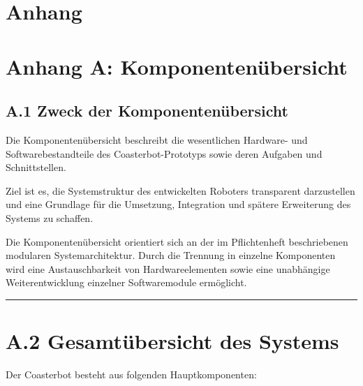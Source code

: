 \documentclass[
  a4paper,
  12pt,
  DIV=12,        %
  parskip=half,  %
  headings=small %
]{scrartcl}
\theoremstyle{definition}
\theoremstyle{definition}
\begin{document}
\section{Anhang}\label{anhang}

\section{Anhang A:
Komponentenübersicht}\label{anhang-a-komponentenuxfcbersicht}

\subsection{A.1 Zweck der
Komponentenübersicht}\label{a.1-zweck-der-komponentenuxfcbersicht}

Die Komponentenübersicht beschreibt die wesentlichen Hardware- und
Softwarebestandteile des Coasterbot-Prototyps sowie deren Aufgaben und
Schnittstellen.

Ziel ist es, die Systemstruktur des entwickelten Roboters transparent
darzustellen und eine Grundlage für die Umsetzung, Integration und
spätere Erweiterung des Systems zu schaffen.

Die Komponentenübersicht orientiert sich an der im Pflichtenheft
beschriebenen modularen Systemarchitektur. Durch die Trennung in
einzelne Komponenten wird eine Austauschbarkeit von Hardwareelementen
sowie eine unabhängige Weiterentwicklung einzelner Softwaremodule
ermöglicht.

\begin{center}\rule{0.5\linewidth}{0.5pt}\end{center}

\section{A.2 Gesamtübersicht des
Systems}\label{a.2-gesamtuxfcbersicht-des-systems}

Der Coasterbot besteht aus folgenden Hauptkomponenten:
\end{document}

